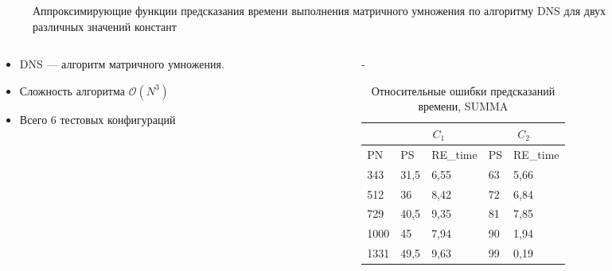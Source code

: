 \documentclass[unicode, t, 11pt]{beamer}%
\newlength{\mylen}
\begin{document}
\begin{frame}
				\begin{figure}
					\captionsetup{font=tiny, labelfont=tiny}
					\centering
					\caption{Аппроксимирующие функции предсказания времени выполнения матричного умножения по алгоритму DNS для двух различных значений констант}
				\end{figure}
				\begin{columns}[T]
					\setlength{\mylen}{0.4\textwidth}
					\begin{column}{\mylen}
						\begin{itemize}[label = \(\bullet\)]
					 		\item DNS — алгоритм матричного умножения.
					 		\item Сложность алгоритма \(\mathcal{O}(N^3)\)
					 		\item Всего 6 тестовых конфигураций
					 	\end{itemize}
					\end{column}
					\begin{column}{\dimexpr\textwidth-\mylen}
						\begin{table}
				 			\captionsetup{font=tiny, labelfont=tiny}
				 			\tiny
								\begin{tabularx}{\textwidth}{|X|X|X||X|X|}
								\hline
						             & \multicolumn{2}{|c||}{\(C_1\)} & \multicolumn{2}{c|}{\(C_2\)} \\ \hline
						        PN   & PS   & RE\_time & PS & RE\_time          \\ \hline
						        343  & 31,5 & 6,55     & 63 & 5,66              \\ \hline
						        512  & 36   & 8,42     & 72 & 6,84              \\ \hline
						        729  & 40,5 & 9,35     & 81 & 7,85              \\ \hline
						        1000 & 45   & 7,94     & 90 & 1,94              \\ \hline
						        1331 & 49,5 & 9,63     & 99 & 0,19              \\ \hline
								\end{tabularx}
							\caption{Относительные ошибки предсказаний времени, SUMMA}
						\end{table}
					\end{column}
				\end{columns}
			\end{frame}
\end{document}
